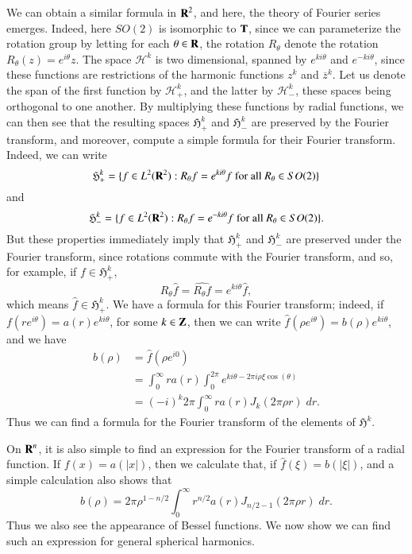 We can obtain a similar formula in $\operatorname{\mathbf{R}}^2$, and here, the theory of Fourier series emerges. Indeed, here $SO(2)$ is isomorphic to $\operatorname{\mathbf{T}}$, since we can parameterize the rotation group by letting for each $\theta \in \operatorname{\mathbf{R}}$, the rotation $R_\theta$ denote the rotation $R_\theta(z) = e^{i \theta} z$. The space $\mathcal{H}^k$ is two dimensional, spanned by $e^{ki\theta}$ and $e^{-k i \theta}$, since these functions are restrictions of the harmonic functions $z^k$ and $\overline{z}^k$. Let us denote the span of the first function by $\mathcal{H}^k_+$, and the latter by $\mathcal{H}^k_-$, these spaces being orthogonal to one another. By multiplying these functions by radial functions, we can then see that the resulting spaces $\mathfrak{H}^k_+$ and $\mathfrak{H}^k_-$ are preserved by the Fourier transform, and moreover, compute a simple formula for their Fourier transform. Indeed, we can write
%
\[ \mathfrak{H}^k_+ = \{ f \in L^2(\operatorname{\mathbf{R}}^2): R_\theta f = e^{k i \theta} f\ \text{for all $R_\theta \in SO(2)$} \} \]
%
and
%
\[ \mathfrak{H}^k_- = \{ f \in L^2(\operatorname{\mathbf{R}}^2): R_\theta f = e^{-k i \theta} f\ \text{for all $R_\theta \in SO(2)$} \}. \]
%
But these properties immediately imply that $\mathfrak{H}^k_+$ and $\mathfrak{H}^k_-$ are preserved under the Fourier transform, since rotations commute with the Fourier transform, and so, for example, if $f \in \mathfrak{H}^k_+$,
%
\[ R_\theta \widehat{f} = \widehat{R_\theta f} = e^{k i \theta} \widehat{f}, \]
%
which means $\widehat{f} \in \mathfrak{H}^k_+$. We have a formula for this Fourier transform; indeed, if $f(r e^{i \theta}) = a(r) e^{k i \theta}$, for some $k \in \operatorname{\mathbf{Z}}$, then we can write $\widehat{f}(\rho e^{i \theta}) = b(\rho) e^{k i \theta}$, and we have
%
\begin{align*}
    b(\rho) &= \widehat{f}( \rho e^{i 0} )\\
    &= \int_0^\infty r a(r) \int_0^{2\pi} e^{k i \theta - 2 \pi i \rho \xi \cos(\theta)}\\
    &= (-i)^k 2 \pi \int_0^\infty r a(r) J_k(2 \pi \rho r)\; dr.
\end{align*}
%
Thus we can find a formula for the Fourier transform of the elements of $\mathfrak{H}^k$.

On $\operatorname{\mathbf{R}}^n$, it is also simple to find an expression for the Fourier transform of a radial function. If $f(x) = a(|x|)$, then we calculate that, if $\widehat{f}(\xi) = b(|\xi|)$, and a simple calculation also shows that
%
\[ b(\rho) = 2 \pi \rho^{1-n/2} \int_0^\infty r^{n/2} a(r) J_{n/2 - 1}(2 \pi \rho r)\; dr. \]
%
Thus we also see the appearance of Bessel functions. We now show we can find such an expression for general spherical harmonics.

